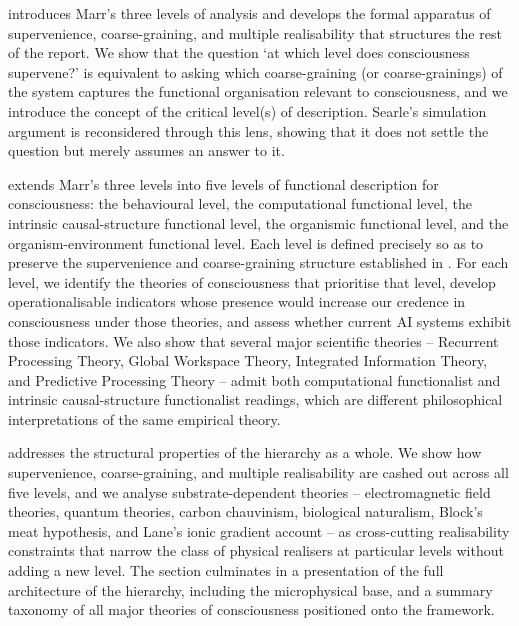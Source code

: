 \documentclass[11pt, a4paper, onecolumn, gdm]{google}
\begin{document}
 introduces Marr's three levels of analysis and develops the formal apparatus of supervenience, coarse-graining, and multiple realisability that structures the rest of the report.
We show that the question `at which level does consciousness supervene?' is equivalent to asking which coarse-graining (or coarse-grainings) of the system captures the functional organisation relevant to consciousness, and we introduce the concept of the critical level(s) of description.
Searle's simulation argument is reconsidered through this lens, showing that it does not settle the question but merely assumes an answer to it.

 extends Marr's three levels into five levels of functional description for consciousness: the behavioural level, the computational functional level, the intrinsic causal-structure functional level, the organismic functional level, and the organism-environment functional level.
Each level is defined precisely so as to preserve the supervenience and coarse-graining structure established in .
For each level, we identify the theories of consciousness that prioritise that level, develop operationalisable indicators whose presence would increase our credence in consciousness under those theories, and assess whether current AI systems exhibit those indicators.
We also show that several major scientific theories -- Recurrent Processing Theory, Global Workspace Theory, Integrated Information Theory, and Predictive Processing Theory -- admit both computational functionalist and intrinsic causal-structure functionalist readings, which are different philosophical interpretations of the same empirical theory.

 addresses the structural properties of the hierarchy as a whole.
We show how supervenience, coarse-graining, and multiple realisability are cashed out across all five levels, and we analyse substrate-dependent theories -- electromagnetic field theories, quantum theories, carbon chauvinism, biological naturalism, Block's meat hypothesis, and Lane's ionic gradient account -- as cross-cutting realisability constraints that narrow the class of physical realisers at particular levels without adding a new level.
The section culminates in a presentation of the full architecture of the hierarchy, including the microphysical base, and a summary taxonomy of all major theories of consciousness positioned onto the framework.
\end{document}

